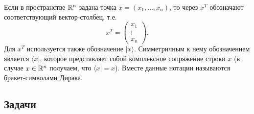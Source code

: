 Если в пространстве $\mathbb R^n$ задана точка $x=(x_1,\dots,x_n)$, то через $x^T$ обозначают соответствующий вектор-столбец, т.е.
$$
x^T=\begin{pmatrix}
x_1 \\ \vdots \\ x_n
\end{pmatrix}.
$$
Для $x^T$ используется также обозначение $|x\rangle$. Симметричным к нему обозначением является $\langle x|$, которое представляет собой комплексное сопряжение строки $x$ (в случае $x\in \mathbb R^n$ получаем, что $\langle x|=x$). Вместе данные нотации называются бракет-символами Дирака.



\subsection*{Задачи}

